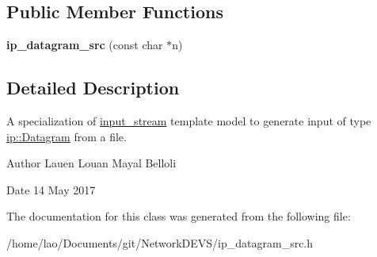 \subsection*{Public Member Functions}
\begin{DoxyCompactItemize}
\item 
{\bfseries ip\+\_\+datagram\+\_\+src} (const char $\ast$n)\hypertarget{classip__datagram__src_a06b73f2700abc04cf41be7e0872e134e}{}\label{classip__datagram__src_a06b73f2700abc04cf41be7e0872e134e}

\end{DoxyCompactItemize}


\subsection{Detailed Description}
A specialization of \hyperlink{classinput__stream}{input\+\_\+stream} template model to generate input of type \hyperlink{structip_1_1Datagram}{ip\+::\+Datagram} from a file. 

\begin{DoxyAuthor}{Author}
Lauen Louan Mayal Belloli 
\end{DoxyAuthor}
\begin{DoxyDate}{Date}
14 May 2017 
\end{DoxyDate}


The documentation for this class was generated from the following file\+:\begin{DoxyCompactItemize}
\item 
/home/lao/\+Documents/git/\+Network\+D\+E\+V\+S/ip\+\_\+datagram\+\_\+src.\+h\end{DoxyCompactItemize}
